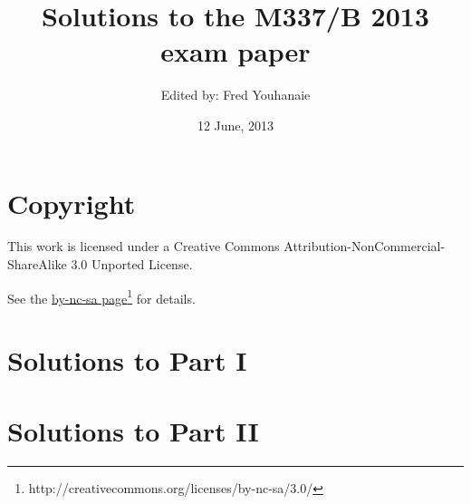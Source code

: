 \documentclass[a4paper,fleqn,12pt,twoside]{article}
\title{Solutions to the M337/B 2013 exam paper}
\author{Edited by: Fred Youhanaie}
\date{12 June, 2013}
\begin{document}
\maketitle

\pagestyle{myheadings}

\section*{Copyright}

This work is licensed under a Creative Commons
Attribution-NonCommercial-ShareAlike 3.0 Unported License.

\newcommand\cclink{http://creativecommons.org/licenses/by-nc-sa/3.0/}
See the \href{\cclink}{by-nc-sa page}\footnote{\cclink} for details.

\section*{Solutions to Part I}

\newpage

\newpage

\newpage

\newpage

\newpage

\newpage

\newpage

\newpage

\section*{Solutions to Part II}

\newpage

\newpage

\newpage

\end{document}

